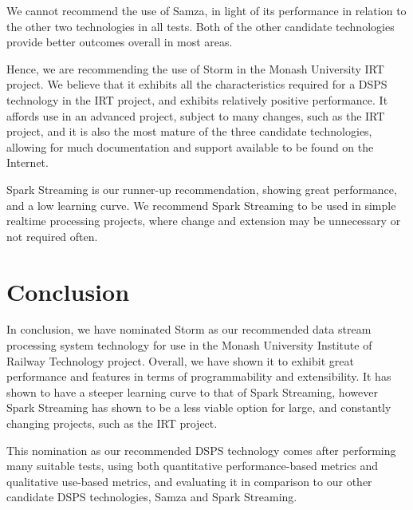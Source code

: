 We cannot recommend the use of Samza, in light of its performance in relation to the other two technologies in all tests.
Both of the other candidate technologies provide better outcomes overall in most areas.

Hence, we are recommending the use of Storm in the Monash University IRT project. We believe that it exhibits all the
characteristics required for a DSPS technology in the IRT project, and exhibits relatively positive performance. It affords
use in an advanced project, subject to many changes, such as the IRT project, and it is
also the most mature of the three candidate technologies, allowing for much documentation and support available to be found on the
Internet.

Spark Streaming is our runner-up recommendation, showing great performance, and a low learning curve. We recommend
Spark Streaming to be used in simple realtime processing projects, where change and extension may be unnecessary or not
required often.



\section{Conclusion} %
\label{sub:evaluation_conclusion}

In conclusion, we have nominated Storm as our recommended data stream processing system technology for use in the Monash
University Institute of Railway Technology project. Overall, we have shown it to exhibit great performance and features
in terms of programmability and extensibility. It has shown to have a steeper learning curve to that of Spark Streaming,
however Spark Streaming has shown to be a less viable option for large, and constantly changing projects, such as the IRT
project.

This nomination as our recommended DSPS technology comes after performing many suitable tests, using both quantitative performance-based
metrics and qualitative use-based metrics, and evaluating it in comparison to our other candidate DSPS technologies, Samza and Spark Streaming.


